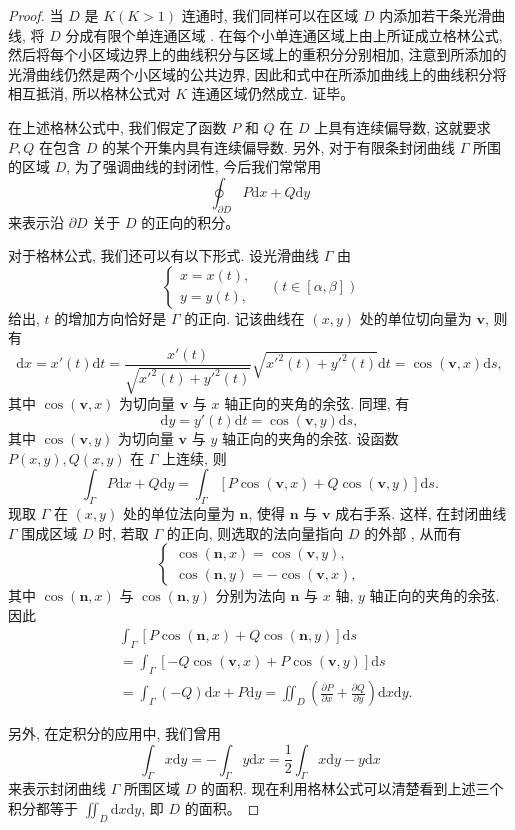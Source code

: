 \documentclass[12pt,fontset=fandol]{ctexart}
\begin{document}
\begin{proof}
当 $D$ 是 $K(K>1)$ 连通时, 我们同样可以在区域 $D$ 内添加若干条光滑曲线, 将 $D$ 分成有限个单连通区域 . 在每个小单连通区域上由上所证成立格林公式, 然后将每个小区域边界上的曲线积分与区域上的重积分分别相加, 注意到所添加的光滑曲线仍然是两个小区域的公共边界, 因此和式中在所添加曲线上的曲线积分将相互抵消, 所以格林公式对 $K$ 连通区域仍然成立. 证毕。

在上述格林公式中, 我们假定了函数 $P$ 和 $Q$ 在 $D$ 上具有连续偏导数, 这就要求 $P,Q$ 在包含 $D$ 的某个开集内具有连续偏导数. 另外, 对于有限条封闭曲线 $\Gamma$ 所围的区域 $D$, 为了强调曲线的封闭性, 今后我们常常用
\[
  \oint_{\partial D}P\mathrm dx+Q\mathrm dy
\]
来表示沿 $\partial D$ 关于 $D$ 的正向的积分。

对于格林公式, 我们还可以有以下形式. 设光滑曲线 $\Gamma$ 由
\[
  \begin{cases}
    x=x(t),\\
    y=y(t),
  \end{cases}\quad (t\in[\alpha,\beta])
\]
给出, $t$ 的增加方向恰好是 $\Gamma$ 的正向. 记该曲线在 $(x,y)$ 处的单位切向量为 $\boldsymbol v$, 则有
\[
  \mathrm dx=x'(t)\mathrm dt
  =\frac{x'(t)}{\sqrt{x'^2(t)+y'^2(t)}}\sqrt{x'^2(t)+y'^2(t)}\mathrm dt
  =\cos(\boldsymbol v,x)\mathrm ds,
\]
其中 $\cos(\boldsymbol v,x)$ 为切向量 $\boldsymbol v$ 与 $x$ 轴正向的夹角的余弦. 同理, 有
\[
  \mathrm dy=y'(t)\mathrm dt=\cos(\boldsymbol v,y)\mathrm ds,
\]
其中 $\cos(\boldsymbol v,y)$ 为切向量 $\boldsymbol v$ 与 $y$ 轴正向的夹角的余弦. 设函数 $P(x,y),Q(x,y)$ 在 $\Gamma$ 上连续, 则
\[
  \int_\Gamma P\mathrm dx+Q\mathrm dy
  =\int_\Gamma[P\cos(\boldsymbol v,x)+Q\cos(\boldsymbol v,y)]\mathrm ds.
\]
现取 $\Gamma$ 在 $(x,y)$ 处的单位法向量为 $\boldsymbol n$, 使得 $\boldsymbol n$ 与 $\boldsymbol v$ 成右手系. 这样, 在封闭曲线 $\Gamma$ 围成区域 $D$ 时, 若取 $\Gamma$ 的正向, 则选取的法向量指向 $D$ 的外部 , 从而有
\[
  \begin{cases}
    \cos(\boldsymbol n,x)=\cos(\boldsymbol v,y),\\
    \cos(\boldsymbol n,y)=-\cos(\boldsymbol v,x),
  \end{cases}
\]
其中 $\cos(\boldsymbol n,x)$ 与 $\cos(\boldsymbol n,y)$ 分别为法向 $\boldsymbol n$ 与 $x$ 轴, $y$ 轴正向的夹角的余弦. 因此
\[
\begin{aligned}
  &\int_\Gamma[P\cos(\boldsymbol n,x)+Q\cos(\boldsymbol n,y)]\mathrm ds\\
  &=\int_\Gamma[-Q\cos(\boldsymbol v,x)+P\cos(\boldsymbol v,y)]\mathrm ds\\
  &=\int_\Gamma(-Q)\mathrm dx+P\mathrm dy
  =\iint_D\left(\frac{\partial P}{\partial x}+\frac{\partial Q}{\partial y}\right)\mathrm dx\mathrm dy.
\end{aligned}
\]

另外, 在定积分的应用中, 我们曾用
\[
  \int_\Gamma x\mathrm dy=-\int_\Gamma y\mathrm dx
  =\frac12\int_\Gamma x\mathrm dy-y\mathrm dx
\]
来表示封闭曲线 $\Gamma$ 所围区域 $D$ 的面积. 现在利用格林公式可以清楚看到上述三个积分都等于 $\iint_D\mathrm dx\mathrm dy$, 即 $D$ 的面积。

\end{proof}
\end{document}
